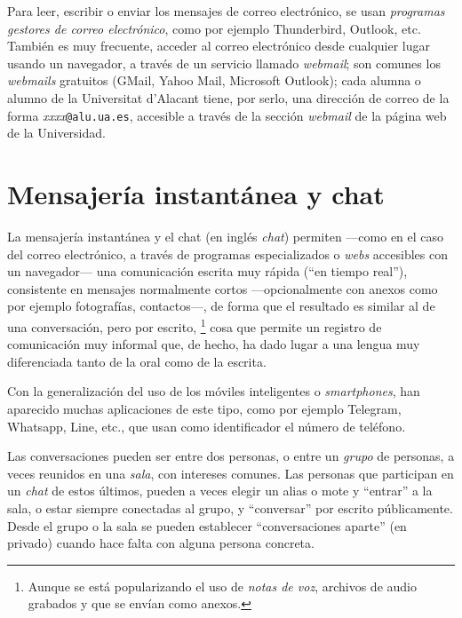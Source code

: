 Para leer, escribir o enviar los mensajes de correo electrónico, se usan \emph{programas gestores de correo electrónico}, como por ejemplo Thunderbird, Outlook, etc. También es muy frecuente, acceder al correo electrónico desde cualquier lugar usando un navegador, a través de un servicio llamado \emph{webmail}; son comunes los \emph{webmails} gratuitos (GMail, Yahoo Mail, Microsoft Outlook); cada alumna o alumno de la Universitat d'Alacant tiene, por serlo, una dirección de correo de la forma \emph{xxxx}\texttt{@alu.ua.es}, accesible a través de la sección \emph{webmail} de la página web de la Universidad. 

\section{Mensajería instantánea y chat} \label{ss:missinst} La mensajería instantánea y el chat (en inglés \emph{chat}) permiten ---como en el caso del correo electrónico, a través de programas especializados o \emph{webs} accesibles con un navegador--- una comunicación escrita muy rápida (``en tiempo real''), consistente en mensajes normalmente cortos ---opcionalmente con anexos como por ejemplo fotografías, contactos---, de forma que el resultado es similar al de una conversación, pero por escrito, \footnote{Aunque se está popularizando el uso de \emph{notas de voz}, archivos de audio grabados y que se envían como anexos.} cosa que permite un registro de comunicación muy informal que, de hecho, ha dado lugar a una lengua muy diferenciada tanto de la oral como de la escrita. 

Con la generalización del uso de los móviles inteligentes o \emph{smartphones}, han aparecido muchas aplicaciones de este tipo, como por ejemplo Telegram, Whatsapp, Line, etc., que usan como identificador el número de teléfono. 

Las conversaciones pueden ser entre dos personas, o entre un \emph{grupo} de personas, a veces reunidos en una \emph{sala}, con intereses comunes. Las personas que participan en un \emph{chat} de estos últimos, pueden a veces elegir un alias o mote y ``entrar'' a la sala, o estar siempre conectadas al grupo, y ``conversar'' por escrito públicamente. Desde el grupo o la sala se pueden establecer ``conversaciones aparte'' (en privado) cuando hace falta con alguna persona concreta. 

